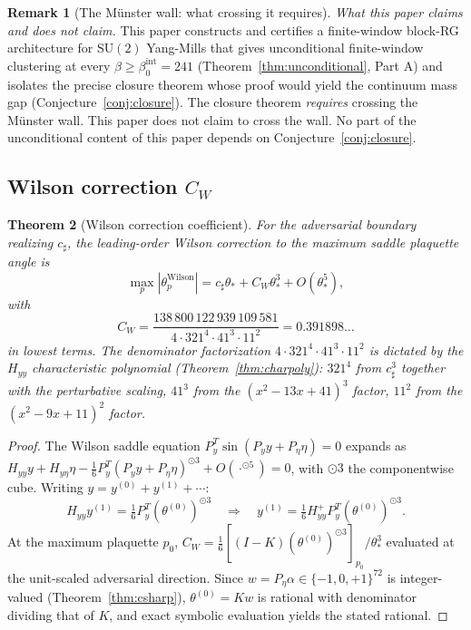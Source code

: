 \documentclass[11pt]{article}
\newtheorem{theorem}{Theorem}[section]
\theoremstyle{definition}
\newtheorem{remark}[theorem]{Remark}
\newcommand{\SU}{\mathrm{SU}}
\begin{document}
\begin{remark}[The M\"unster wall: what crossing it requires]
\emph{What this paper claims and does not claim.}  This paper
constructs and certifies a finite-window block-RG architecture for
$\SU(2)$ Yang-Mills that gives unconditional finite-window
clustering at every $\beta\ge\beta_0^{\mathrm{int}}=241$
\textup{(}Theorem~\ref{thm:unconditional}, Part A\textup{)} and
isolates the precise closure theorem whose proof would yield the
continuum mass gap \textup{(}Conjecture~\ref{conj:closure}\textup{)}.
The closure theorem \emph{requires} crossing the M\"unster wall.
This paper does not claim to cross the wall.  No part of the
unconditional content of this paper depends on
Conjecture~\ref{conj:closure}.
\end{remark}

\subsection{Wilson correction $C_W$}

\begin{theorem}[Wilson correction coefficient]\label{thm:CW}
For the adversarial boundary realizing $c_\sharp$, the leading-order
Wilson correction to the maximum saddle plaquette angle is
\[
\max_p|\theta_p^{\mathrm{Wilson}}|=c_\sharp\theta_*+C_W\theta_*^3+O(\theta_*^5),
\]
with
\[
C_W=\frac{138\,800\,122\,939\,109\,581}{4\cdot 321^4\cdot 41^3\cdot 11^2}=0.391898\ldots
\]
in lowest terms.  The denominator factorization
$4\cdot 321^4\cdot 41^3\cdot 11^2$ is dictated by the $H_{yy}$
characteristic polynomial (Theorem~\ref{thm:charpoly}): $321^4$ from
$c_\sharp^3$ together with the perturbative scaling, $41^3$ from the
$(x^2-13x+41)^3$ factor, $11^2$ from the $(x^2-9x+11)^2$ factor.
\end{theorem}

\begin{proof}
The Wilson saddle equation $P_y^T\sin(P_y y+P_\eta\eta)=0$ expands
as $H_{yy}y+H_{y\eta}\eta-\tfrac{1}{6}P_y^T(P_y y+P_\eta\eta)^{\odot 3}+
O(\cdot^{\odot 5})=0$, with $\odot 3$ the componentwise cube.
Writing $y=y^{(0)}+y^{(1)}+\cdots$:
\[
H_{yy}y^{(1)}=\tfrac{1}{6}P_y^T(\theta^{(0)})^{\odot 3}
\quad\Longrightarrow\quad
y^{(1)}=\tfrac{1}{6}H_{yy}^+ P_y^T(\theta^{(0)})^{\odot 3}.
\]
At the maximum plaquette $p_0$,
$C_W=\tfrac{1}{6}[(I-K)(\theta^{(0)})^{\odot 3}]_{p_0}/\theta_*^3$
evaluated at the unit-scaled adversarial direction.  Since
$w=P_\eta\alpha\in\{-1,0,+1\}^{72}$ is integer-valued
(Theorem~\ref{thm:csharp}), $\theta^{(0)}=Kw$ is rational with
denominator dividing that of $K$, and exact symbolic evaluation
yields the stated rational.
\end{proof}
\end{document}
